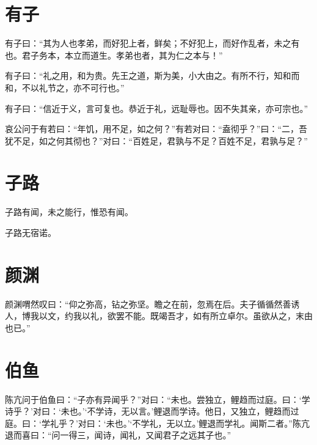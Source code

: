 \documentclass[a5paper]{ctexbook}
\begin{document}
    \chapter{有子}

    有子曰：“其为人也孝弟，而好犯上者，鲜矣；不好犯上，而好作乱者，未之有也。君子务本，本立而道生。孝弟也者，其为仁之本与！”

    有子曰：“礼之用，和为贵。先王之道，斯为美，小大由之。有所不行，知和而和，不以礼节之，亦不可行也。”

    有子曰：“信近于义，言可复也。恭近于礼，远耻辱也。因不失其亲，亦可宗也。”

    哀公问于有若曰：“年饥，用不足，如之何？”有若对曰：“盍彻乎？”曰：“二，吾犹不足，如之何其彻也？”对曰：“百姓足，君孰与不足？百姓不足，君孰与足？”

    \chapter{子路}

    子路有闻，未之能行，惟恐有闻。

    子路无宿诺。

    \chapter{颜渊}

    颜渊喟然叹曰：“仰之弥高，钻之弥坚。瞻之在前，忽焉在后。夫子循循然善诱人，博我以文，约我以礼，欲罢不能。既竭吾才，如有所立卓尔。虽欲从之，末由也已。”

    \chapter{伯鱼}

    陈亢问于伯鱼曰：“子亦有异闻乎？”对曰：“未也。尝独立，鲤趋而过庭。曰：‘学诗乎？’对曰：‘未也。’‘不学诗，无以言。’鲤退而学诗。他日，又独立，鲤趋而过庭。曰：‘学礼乎？’对曰：‘未也。’‘不学礼，无以立。’鲤退而学礼。闻斯二者。”陈亢退而喜曰：“问一得三，闻诗，闻礼，又闻君子之远其子也。”
\end{document}
